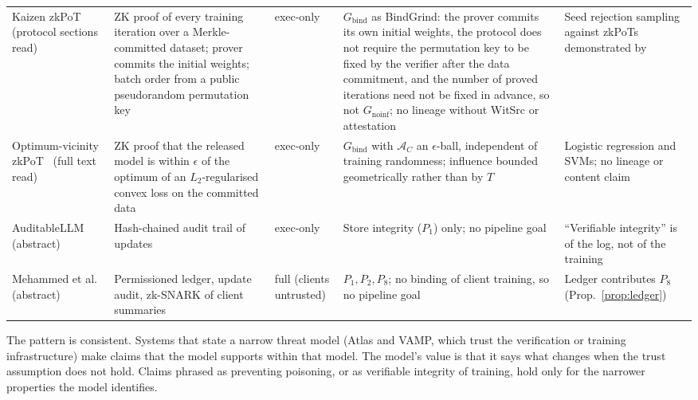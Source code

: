 \begin{table}[t]
\begin{tabular}{@{}p{2.3cm}p{3.6cm}p{2.1cm}p{4.6cm}p{3.6cm}@{}}
Kaizen zkPoT~\cite{abbaszadeh2024zkpot} (protocol sections read) & ZK proof of every training iteration over a Merkle-committed dataset; prover commits the initial weights; batch order from a public pseudorandom permutation key & exec-only & $G_{\mathrm{bind}}$ as \textsf{BindGrind}: the prover commits its own initial weights, the protocol does not require the permutation key to be fixed by the verifier after the data commitment, and the number of proved iterations need not be fixed in advance, so not $G_{\mathrm{noinf}}$; no lineage without WitSrc or attestation & Seed rejection sampling against zkPoTs demonstrated by~\cite{tan2025zkpot}\\
Optimum-vicinity zkPoT~\cite{tan2025zkpot} (full text read) & ZK proof that the released model is within $\epsilon$ of the optimum of an $L_2$-regularised convex loss on the committed data & exec-only & $G_{\mathrm{bind}}$ with $\mathcal A_C$ an $\epsilon$-ball, independent of training randomness; influence bounded geometrically rather than by $T$ & Logistic regression and SVMs; no lineage or content claim\\
AuditableLLM~\cite{li2025auditablellm} (abstract) & Hash-chained audit trail of updates & exec-only & Store integrity ($P_1$) only; no pipeline goal & ``Verifiable integrity'' is of the log, not of the training\\
Mehammed et al.~\cite{mehammed2025fl} (abstract) & Permissioned ledger, update audit, zk-SNARK of client summaries & full (clients untrusted) & $P_1,P_2,P_8$; no binding of client training, so no pipeline goal & Ledger contributes $P_8$ (Prop.~\ref{prop:ledger})\\
\bottomrule
\end{tabular}
\end{table}

The pattern is consistent. Systems that state a narrow threat model (Atlas and VAMP, which
trust the verification or training infrastructure) make claims that the model supports
within that model. The model's value is that it says what changes when the trust assumption
does not hold. Claims phrased as preventing poisoning, or as verifiable integrity of
training, hold only for the narrower properties the model identifies.
